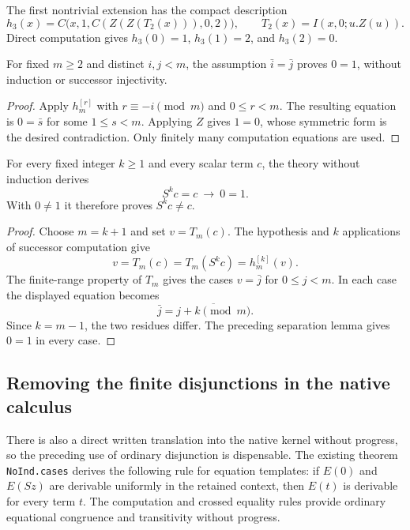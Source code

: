 The first nontrivial extension has the compact description
\[
 h_3(x)=C\bigl(x,1,C(Z(Z(T_2(x))),0,2)\bigr),
 \qquad T_2(x)=I(x,0;u.Z(u)).
\]
Direct computation gives $h_3(0)=1$, $h_3(1)=2$, and $h_3(2)=0$.

\begin{lemma}
For fixed $m\geq2$ and distinct $i,j<m$, the assumption
$\bar i=\bar j$ proves $0=1$, without induction or successor injectivity.
\end{lemma}
\begin{proof}
Apply $h_m^{[r]}$ with $r\equiv-i\pmod m$ and $0\leq r<m$.
The resulting equation is $0=\bar s$ for some $1\leq s<m$.
Applying $Z$ gives $1=0$, whose symmetric form is the desired
contradiction. Only finitely many computation equations are used.
\end{proof}

\begin{theorem}
For every fixed integer $k\geq1$ and every scalar term $c$, the theory
without induction derives
\[
 S^k c=c\ \longrightarrow\ 0=1.
\]
With $0\ne1$ it therefore proves $S^k c\ne c$.
\end{theorem}
\begin{proof}
Choose $m=k+1$ and set $v=T_m(c)$. The hypothesis and $k$ applications of
successor computation give
\[
 v=T_m(c)=T_m(S^k c)=h_m^{[k]}(v).
\]
The finite-range property of $T_m$ gives the cases $v=\bar j$ for
$0\leq j<m$. In each case the displayed equation becomes
\[
 \bar j=\overline{j+k\pmod m}.
\]
Since $k=m-1$, the two residues differ. The preceding separation lemma
gives $0=1$ in every case.
\end{proof}

\subsection{Removing the finite disjunctions in the native calculus}

There is also a direct written translation into the native kernel without
progress, so the preceding use of ordinary disjunction is dispensable.
The existing theorem \texttt{NoInd.cases} derives the following rule for
equation templates: if $E(0)$ and $E(Sz)$ are derivable uniformly in the
retained context, then $E(t)$ is derivable for every term $t$. The
computation and crossed equality rules provide ordinary equational
congruence and transitivity without progress.

